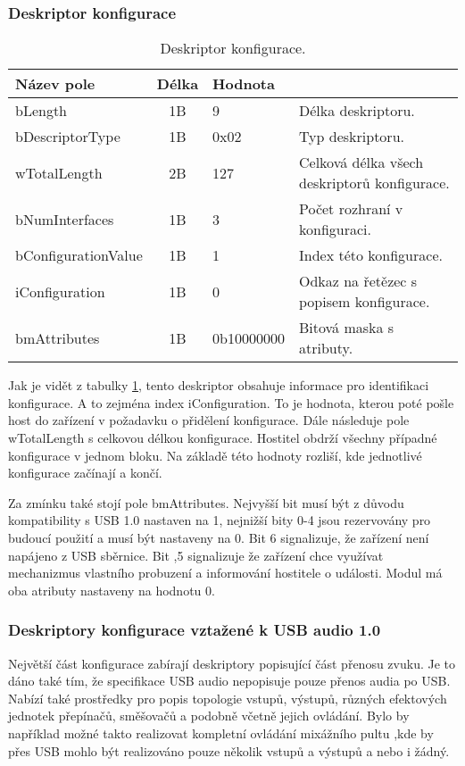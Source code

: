 \subsubsection{Deskriptor konfigurace}
\begin{table}[ht!]
\begin{center}
\begin{tabular}{|l|c|l|l|}
\hline 
Název pole & Délka & Hodnota &  \\ 
\hline
bLength & 1B & 9 & Délka deskriptoru.\\
\hline
bDescriptorType & 1B & 0x02 & Typ deskriptoru. \\
\hline
wTotalLength & 2B & 127 & Celková délka všech deskriptorů konfigurace.\\
\hline
bNumInterfaces & 1B & 3 & Počet rozhraní v konfiguraci.\\
\hline
bConfigurationValue & 1B & 1 & Index této konfigurace.\\
\hline
iConfiguration & 1B & 0 & Odkaz na řetězec s popisem konfigurace.\\
\hline
bmAttributes & 1B & 0b10000000 & Bitová maska s atributy.\\
\hline
\end{tabular} 
\end{center}
\caption{Deskriptor konfigurace.}
\label{tab:usb-conf-desc} 
\end{table}

Jak je vidět z tabulky \ref{tab:usb-conf-desc}, tento deskriptor obsahuje informace pro identifikaci konfigurace. A to zejména index iConfiguration. To je hodnota, kterou poté pošle host do zařízení v požadavku o přidělení konfigurace. Dále následuje pole wTotalLength s celkovou délkou konfigurace. Hostitel obdrží všechny případné konfigurace v jednom bloku. Na základě této hodnoty rozliší, kde jednotlivé konfigurace začínají a končí.

Za zmínku také stojí pole bmAttributes. Nejvyšší bit musí být z důvodu kompatibility s USB 1.0 nastaven na 1, nejnižší bity 0-4 jsou rezervovány pro budoucí použití a musí být nastaveny na 0. Bit 6 signalizuje, že zařízení není napájeno z USB sběrnice. Bit ,5 signalizuje že zařízení chce využívat mechanizmus vlastního probuzení a informování hostitele o události. Modul má oba atributy nastaveny na hodnotu 0.


\subsubsection{Deskriptory konfigurace vztažené k USB audio 1.0}
Největší část konfigurace zabírají deskriptory popisující část přenosu zvuku. Je to dáno také tím, že specifikace USB audio \cite{usb-audio} nepopisuje pouze přenos audia po USB. Nabízí také prostředky pro popis topologie vstupů, výstupů, různých efektových jednotek přepínačů, směšovačů a podobně včetně jejich ovládání. Bylo by například možné takto realizovat kompletní ovládání mixážního pultu ,kde by přes USB mohlo být realizováno pouze několik vstupů a výstupů a nebo i žádný.

